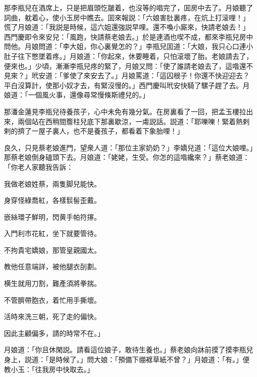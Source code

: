 那李瓶兒在酒席上，只是把眉頭忔皺着，也沒等的唱完了，囬房中去了。月娘聽了詞曲，躭着心，使小玉房中瞧去。囬來報説：「六娘害肚裏疼，在炕上打滚哩！」慌了月娘道：「我説是時候，這六姐還強説早哩。還不喚小廝來，快請老娘去！」西門慶即令來安兒：「風跑，快請蔡老娘去。」於是連酒也喫不成，都來李瓶兒房中問他。月娘問道：「李大姐，你心裏覺怎的？」李瓶兒囬道：「大娘，我只心口連小肚子往下憋墜着疼。」月娘道：「你起來，休要睡着，只怕滚壞了胎。老娘請去了，便來也。」少頃，漸漸李瓶兒疼的緊了，月娘又問：「使了誰請老娘去了，這喒還不見來？」玳安道：「爹使了來安去了。」月娘罵道：「這囚根子！你還不快迎迎去？平白沒算計，使那小奴才去，有緊沒慢的。」西門慶叫玳安快騎了騾子趕了去。月娘道：「一個風火事，還像尋常慢條斯禮兒的。」

那潘金蓮見李瓶兒待養孩子，心中未免有幾分氣。在房裏看了一回，把孟玉樓拉出來，兩個站在西稍間簷柱兒底下那裏歇涼，一䖏説話。説道：「耶嚛嚛！緊着熱剌剌的擠了一屋子裏人，也不是養孩子，都看着下象胎哩！」

良久，只見蔡老娘進門，望衆人道：「那位主家奶奶？」李嬌兒道：「這位大娘哩。」那蔡老娘倒身磕頭下去。月娘道：「姥姥，生受。你怎的這喒纔來？」蔡老娘道：「你老人家聽我告訴：

\begin{myquote}
我做老娘姓蔡，兩隻脚兒能快。

身穿怪綠喬紅，各樣䯼髻歪戴。

嵌絲環子鮮明，閃黄手帕符㩟。

入門利市花紅，坐下就要管待。

不拘貴宅嬌娘，那管皇親國太。

教他任意端詳，被他腿衣㓦劃。

横生就用刀割，難產須將拳揣。

不管臍帶胞衣，着忙用手撕壞。

活時來洗三朝，死了走的偏快。

因此主顧偏多，請的時常不在。」
\end{myquote}

月娘道：「你且休閑説。請看這位娘子，敢待生養也。」蔡老娘向牀前摸了摸李瓶兒身上，説道：「是時候了。」問大娘：「預備下绷褯草紙不曾？」月娘道：「有。」便教小玉：「往我房中快取去。」

